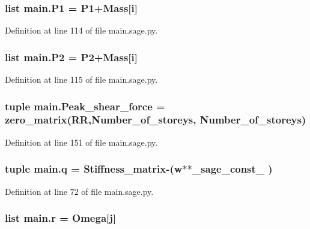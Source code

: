 \subsubsection[{P1}]{\setlength{\rightskip}{0pt plus 5cm}list main.\+P1 = P1+Mass\mbox{[}{\bf i}\mbox{]}}\label{namespacemain_add7e0394c94a2e2115aff785eb6995e3}


Definition at line 114 of file main.\+sage.\+py.

\hypertarget{namespacemain_a1b83b7a3849a8e1c84b9906c45625fec}{}
\subsubsection[{P2}]{\setlength{\rightskip}{0pt plus 5cm}list main.\+P2 = P2+Mass\mbox{[}{\bf i}\mbox{]}}\label{namespacemain_a1b83b7a3849a8e1c84b9906c45625fec}


Definition at line 115 of file main.\+sage.\+py.

\hypertarget{namespacemain_a6461376590c833b81e5920e96ed3d5bf}{}
\subsubsection[{Peak\+\_\+shear\+\_\+force}]{\setlength{\rightskip}{0pt plus 5cm}tuple main.\+Peak\+\_\+shear\+\_\+force = zero\+\_\+matrix(R\+R,Number\+\_\+of\+\_\+storeys, Number\+\_\+of\+\_\+storeys)}\label{namespacemain_a6461376590c833b81e5920e96ed3d5bf}


Definition at line 151 of file main.\+sage.\+py.

\hypertarget{namespacemain_a1787a37505189f764069a45071189112}{}
\subsubsection[{q}]{\setlength{\rightskip}{0pt plus 5cm}tuple main.\+q = {\bf Stiffness\+\_\+matrix}-\/({\bf w}$\ast$$\ast${\bf \+\_\+sage\+\_\+const\+\_} )}\label{namespacemain_a1787a37505189f764069a45071189112}


Definition at line 72 of file main.\+sage.\+py.

\hypertarget{namespacemain_a4760f4121f66000c5570f75176649cb8}{}
\subsubsection[{r}]{\setlength{\rightskip}{0pt plus 5cm}list main.\+r = {\bf Omega}\mbox{[}{\bf j}\mbox{]}}\label{namespacemain_a4760f4121f66000c5570f75176649cb8}


